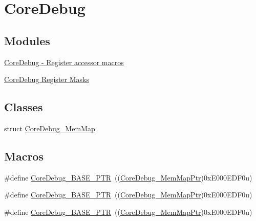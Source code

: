 \hypertarget{group___core_debug___peripheral}{}\section{Core\+Debug}
\label{group___core_debug___peripheral}
\subsection*{Modules}
\begin{DoxyCompactItemize}
\item 
\hyperlink{group___core_debug___register___accessor___macros}{Core\+Debug -\/ Register accessor macros}
\item 
\hyperlink{group___core_debug___register___masks}{Core\+Debug Register Masks}
\end{DoxyCompactItemize}
\subsection*{Classes}
\begin{DoxyCompactItemize}
\item 
struct \hyperlink{struct_core_debug___mem_map}{Core\+Debug\+\_\+\+Mem\+Map}
\end{DoxyCompactItemize}
\subsection*{Macros}
\begin{DoxyCompactItemize}
\item 
\#define \hyperlink{group___core_debug___peripheral_ga994a185afca30ede538d89322c4f0326}{Core\+Debug\+\_\+\+B\+A\+S\+E\+\_\+\+P\+TR}~((\hyperlink{group___core_debug___peripheral_gaa548220bc91b12bd49065fe752579fcd}{Core\+Debug\+\_\+\+Mem\+Map\+Ptr})0x\+E000\+E\+D\+F0u)
\item 
\#define \hyperlink{group___core_debug___peripheral_ga994a185afca30ede538d89322c4f0326}{Core\+Debug\+\_\+\+B\+A\+S\+E\+\_\+\+P\+TR}~((\hyperlink{group___core_debug___peripheral_gaa548220bc91b12bd49065fe752579fcd}{Core\+Debug\+\_\+\+Mem\+Map\+Ptr})0x\+E000\+E\+D\+F0u)
\item 
\#define \hyperlink{group___core_debug___peripheral_ga994a185afca30ede538d89322c4f0326}{Core\+Debug\+\_\+\+B\+A\+S\+E\+\_\+\+P\+TR}~((\hyperlink{group___core_debug___peripheral_gaa548220bc91b12bd49065fe752579fcd}{Core\+Debug\+\_\+\+Mem\+Map\+Ptr})0x\+E000\+E\+D\+F0u)
\end{DoxyCompactItemize}
